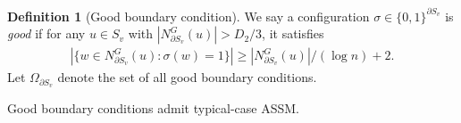 \documentclass[11pt]{amsart}
\newcommand{\defeq}{:=}
\newcommand{\nbd}[2]{N_{#1}^{#2}}
\theoremstyle{definition}
\newtheorem{condition}[theorem]{Condition}
\newtheorem{definition}[theorem]{Definition}
\theoremstyle{remark}
\begin{document}
\begin{definition}[Good boundary condition]\label{def:good-boundary-configuration}
  We say a configuration $\sigma \in \{0,1\}^{\partial S_v}$ is \emph{good} if for any $u \in S_v$ with $|\nbd{\partial S_v}{G}(u)|>D_2/3$, it satisfies
\begin{align*}
    |\{w\in \nbd{\partial S_v}{G}(u): \sigma(w) = 1\}|\geq |\nbd{\partial S_v}{G}(u)|/(\log n) + 2.
\end{align*}  
Let $\Omega_{\partial S_v}$ denote the set of all good boundary conditions.
\end{definition}

Good boundary conditions admit typical-case ASSM.




\end{document}
